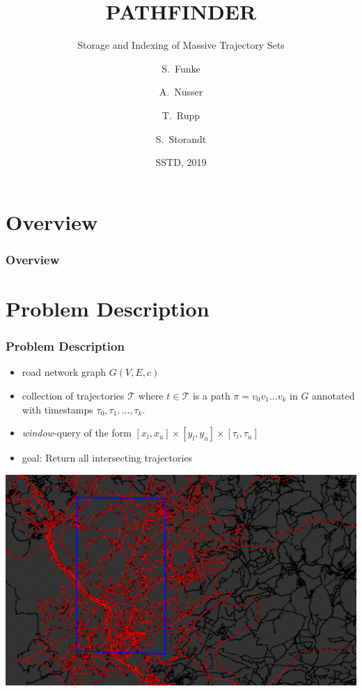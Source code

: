 \documentclass{beamer}
\title[Pathfinder] %
{PATHFINDER}
\subtitle{Storage and Indexing of Massive Trajectory Sets}
\author[Funke, Nusser, Rupp, Storandt] %
{S.~Funke\inst{1} \and A.~Nusser\inst{2} \and T.~Rupp\inst{3} \and S.~Storandt\inst{4}}
\institute[Universities] %
{
	\inst{1}%
	University of Stuttgart
	\and
	\inst{2}%
	Max Planck Institute for Informatics
	\and
	\inst{3}%
	University of Stuttgart
	\and
	\inst{4}%
	University of Konstanz
}
\date[SSTD 2019] %
{SSTD, 2019}
\begin{document}
\frame{\titlepage}

\section{Overview}
\begin{frame}
	\frametitle{Overview}
	\tableofcontents[
		currentsection=show,
		currentsubsection=shaded,
		subsectionstyle=hide
	]
\end{frame}

\section{Problem Description}
\begin{frame}
	\frametitle{Problem Description}
	\begin{itemize}
		\item road network graph $G(V,E,c)$ \pause
		\item collection of trajectories $\mathcal{T}$ where $t\in \mathcal{T}$ is a path $\pi=v_0 v_1 \dots v_k$ in $G$ annotated with timestamps $\tau_0, \tau_1, \dots, \tau_k$. \pause
		\item \emph{window}-query of the form $[x_l, x_u]\times[y_l, y_u]\times[\tau_l, \tau_u]$ \pause
		\item goal: Return all intersecting trajectories \pause


	\end{itemize}
	\includegraphics[width=0.75\linewidth]{graphics/saarland_real_data_gimp.pdf}
\end{frame}
\end{document}
